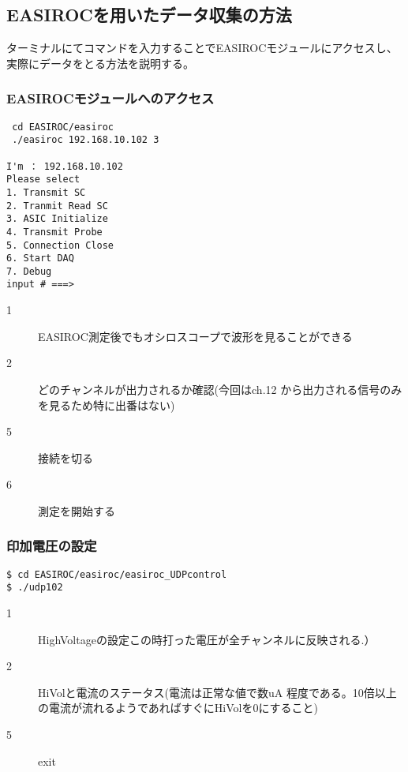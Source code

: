 \documentclass[10pt,a4j]{jarticle}
\begin{document}
\subsection{EASIROCを用いたデータ収集の方法}
ターミナルにてコマンドを入力することでEASIROCモジュールにアクセスし、実際にデータをとる方法を説明する。
\subsubsection{EASIROCモジュールへのアクセス}
\begin{lstlisting}
 cd EASIROC/easiroc                 
 ./easiroc 192.168.10.102 3

I'm ： 192.168.10.102
Please select 
1. Transmit SC
2. Tranmit Read SC
3. ASIC Initialize
4. Transmit Probe
5. Connection Close
6. Start DAQ
7. Debug
input # ===>
\end{lstlisting}

\begin{description}
\item[1]  EASIROC測定後でもオシロスコープで波形を見ることができる
\item[2]  どのチャンネルが出力されるか確認(今回はch.12 から出力される信号のみを見るため特に出番はない)
\item[5] 接続を切る
\item[6] 測定を開始する
\end{description}

\subsubsection{印加電圧の設定}
\begin{lstlisting}
$ cd EASIROC/easiroc/easiroc_UDPcontrol
$ ./udp102
\end{lstlisting}

\begin{description}
\item[1]  HighVoltageの設定この時打った電圧が全チャンネルに反映される.）
\item[2]  HiVolと電流のステータス(電流は正常な値で数uA 程度である。10倍以上の電流が流れるようであればすぐにHiVolを0にすること)
\item[5]  exit
\end{description}
\end{document}
